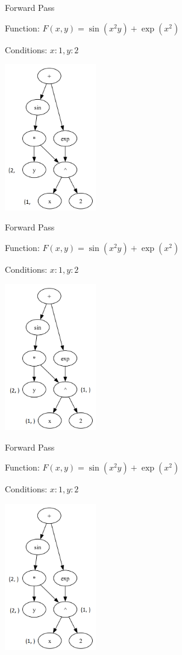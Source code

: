 \documentclass{beamer}
\begin{document}
\begin{frame}{Forward Pass}

Function: $F(x, y) = \sin(x^2 y) + \exp(x^2)$

Conditions: ${x:1, y:2}$
\begin{center}
        \includegraphics[width=4cm]{DAG_gif_images/fwd_1_fix_1.png}
\end{center}
\end{frame}

\begin{frame}{Forward Pass}

Function: $F(x, y) = \sin(x^2 y) + \exp(x^2)$

Conditions: ${x:1, y:2}$
\begin{center}
        \includegraphics[width=4cm]{DAG_gif_images/fwd_1_fix_2.png}
\end{center}
\end{frame}

\begin{frame}{Forward Pass}

Function: $F(x, y) = \sin(x^2 y) + \exp(x^2)$

Conditions: ${x:1, y:2}$
\begin{center}
        \includegraphics[width=4cm]{DAG_gif_images/fwd_1_fix_3.png}
\end{center}
\end{frame}
\end{document}
